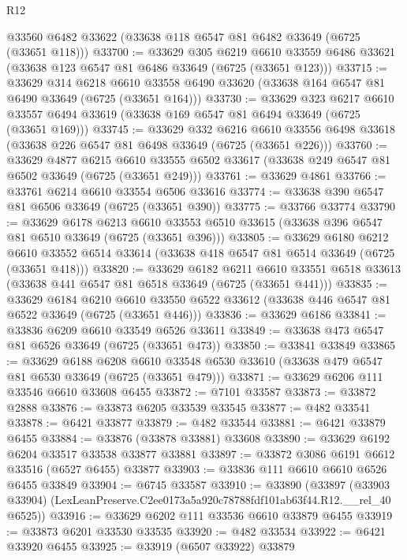 \begin{lexlean}{R12}
\begin{coremodule}
    @33560
    @6482
    @33622
    (@33638 @118 @6547 @81 @6482 @33649 (@6725 (@33651 @118)))
@33700 := @33629
    @305
    @6219
    @6610
    @33559
    @6486
    @33621
    (@33638 @123 @6547 @81 @6486 @33649 (@6725 (@33651 @123)))
@33715 := @33629
    @314
    @6218
    @6610
    @33558
    @6490
    @33620
    (@33638 @164 @6547 @81 @6490 @33649 (@6725 (@33651 @164)))
@33730 := @33629
    @323
    @6217
    @6610
    @33557
    @6494
    @33619
    (@33638 @169 @6547 @81 @6494 @33649 (@6725 (@33651 @169)))
@33745 := @33629
    @332
    @6216
    @6610
    @33556
    @6498
    @33618
    (@33638 @226 @6547 @81 @6498 @33649 (@6725 (@33651 @226)))
@33760 := @33629
    @4877
    @6215
    @6610
    @33555
    @6502
    @33617
    (@33638 @249 @6547 @81 @6502 @33649 (@6725 (@33651 @249)))
@33761 := @33629 @4861
@33766 := @33761 @6214 @6610 @33554 @6506 @33616
@33774 := @33638 @390 @6547 @81 @6506 @33649 (@6725 (@33651 @390))
@33775 := @33766 @33774
@33790 := @33629
    @6178
    @6213
    @6610
    @33553
    @6510
    @33615
    (@33638 @396 @6547 @81 @6510 @33649 (@6725 (@33651 @396)))
@33805 := @33629
    @6180
    @6212
    @6610
    @33552
    @6514
    @33614
    (@33638 @418 @6547 @81 @6514 @33649 (@6725 (@33651 @418)))
@33820 := @33629
    @6182
    @6211
    @6610
    @33551
    @6518
    @33613
    (@33638 @441 @6547 @81 @6518 @33649 (@6725 (@33651 @441)))
@33835 := @33629
    @6184
    @6210
    @6610
    @33550
    @6522
    @33612
    (@33638 @446 @6547 @81 @6522 @33649 (@6725 (@33651 @446)))
@33836 := @33629 @6186
@33841 := @33836 @6209 @6610 @33549 @6526 @33611
@33849 := @33638 @473 @6547 @81 @6526 @33649 (@6725 (@33651 @473))
@33850 := @33841 @33849
@33865 := @33629
    @6188
    @6208
    @6610
    @33548
    @6530
    @33610
    (@33638 @479 @6547 @81 @6530 @33649 (@6725 (@33651 @479)))
@33871 := @33629 @6206 @111 @33546 @6610 @33608 @6455
@33872 := @7101 @33587
@33873 := @33872 @2888
@33876 := @33873 @6205 @33539 @33545
@33877 := @482 @33541
@33878 := @6421 @33877
@33879 := @482 @33544
@33881 := @6421 @33879 @6455
@33884 := @33876 (@33878 @33881) @33608
@33890 := @33629 @6192 @6204 @33517 @33538 @33877 @33881
@33897 := @33872 @3086 @6191 @6612 @33516 (@6527 @6455) @33877
@33903 := @33836 @111 @6610 @6610 @6526 @6455 @33849
@33904 := @6745 @33587
@33910 := @33890
    (@33897 (@33903 @33904) (LexLeanPreserve.C2ee0173a5a920c78788fdf101ab63f44.R12.__rel_40 @6525))
@33916 := @33629 @6202 @111 @33536 @6610 @33879 @6455
@33919 := @33873 @6201 @33530 @33535
@33920 := @482 @33534
@33922 := @6421 @33920 @6455
@33925 := @33919 (@6507 @33922) @33879

\end{coremodule}
\end{lexlean}
